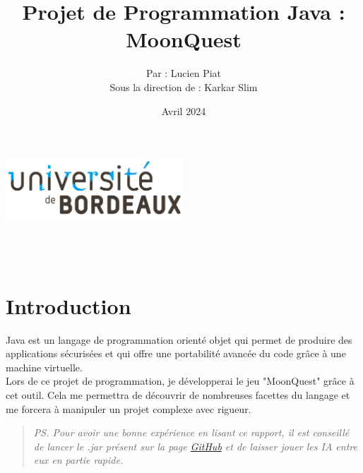 \documentclass[titlepage]{report}
\title{Projet de Programmation Java : MoonQuest}
\author{Par : Lucien Piat \\ \vspace{.5cm} Sous la direction de : Karkar Slim}
\date{Avril 2024}
\makeatletter
\def\maketitle{
\raggedright
\begin{center}
\includegraphics[width = 0.5\textwidth]{img/logo_ub.png}\\[15ex]
{\Huge \bfseries \@title }\\[10ex] 
{\huge  \@author}\\[10ex] 
{\Large \@date}\\
\end{center}}
\makeatother
\begin{document}
\maketitle
\thispagestyle{empty} 
\newpage
\tableofcontents
\thispagestyle{empty} 

\justify 

\chapter{Introduction}
Java est un langage de programmation orienté objet qui permet de produire des applications sécurisées et qui offre une portabilité avancée du code grâce à une machine virtuelle.\\

Lors de ce projet de programmation, je développerai le jeu "MoonQuest" grâce à cet outil.  Cela me permettra de découvrir de nombreuses facettes du langage et me forcera à manipuler un projet complexe avec rigueur.\\

\begin{quotation}
    \textit{PS. Pour avoir une bonne expérience en lisant ce rapport, il est conseillé de lancer le .jar présent sur la page \href{https://github.com/Lucien-Piat/MoonQuest}{GitHub} et de laisser jouer les IA entre eux en partie rapide.}
\end{quotation}

\vspace*{2cm}
\begin{figure}[h]
    \centering
\end{figure}
\end{document}
